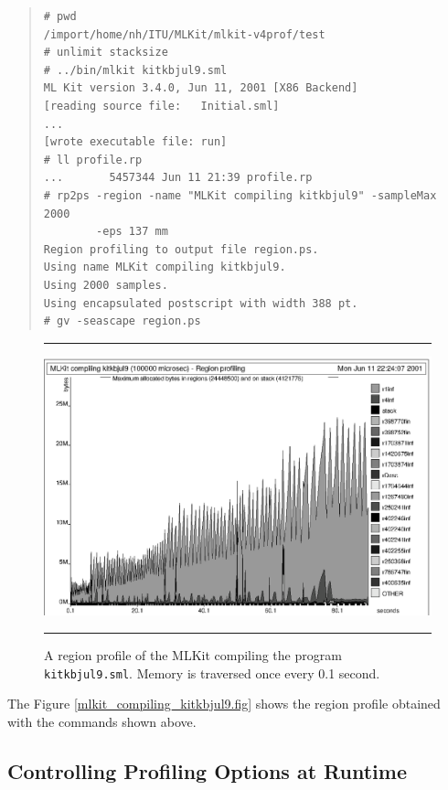\documentclass[12pt]{book}
\begin{document}
\begin{small}
\begin{quote}
\begin{verbatim}
# pwd
/import/home/nh/ITU/MLKit/mlkit-v4prof/test
# unlimit stacksize
# ../bin/mlkit kitkbjul9.sml
ML Kit version 3.4.0, Jun 11, 2001 [X86 Backend]
[reading source file:   Initial.sml]
...
[wrote executable file: run]
# ll profile.rp 
...       5457344 Jun 11 21:39 profile.rp
# rp2ps -region -name "MLKit compiling kitkbjul9" -sampleMax 2000 
        -eps 137 mm
Region profiling to output file region.ps.
Using name MLKit compiling kitkbjul9.
Using 2000 samples.
Using encapsulated postscript with width 388 pt.
# gv -seascape region.ps
\end{verbatim}
\end{quote}
\end{small}

\begin{figure}
\hrule \medskip
\begin{center}
\includegraphics{mlkit_compiling_kitkbjul9_400msec.eps}
\end{center}
\caption{A region profile of the MLKit compiling the program \texttt{kitkbjul9.sml}. 
 Memory is traversed once every 0.1 second.}
\label{mlkit_compiling_kitkbjul9_400msec.fig}
\medskip\hrule
\end{figure}

The Figure \ref{mlkit_compiling_kitkbjul9.fig} shows the region
profile obtained with the commands shown above.

\subsection{Controlling Profiling Options at Runtime}
\end{document}
